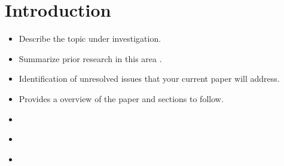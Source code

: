 \section{Introduction}

\begin{itemize}
  \item Describe the topic under investigation.
  \item Summarize prior research in this area \citep{ronneberger-2015-unet}.
  \item Identification of unresolved issues that your current paper will address.
  \item Provides a overview of the paper and sections to follow.
\end{itemize}


\begin{itemize}
  \item \citep{wiki-2021-melanoma}
  \item \citep{acs-2021-melanoma}
  \item \citep{isic-2018-segmentation}
\end{itemize}